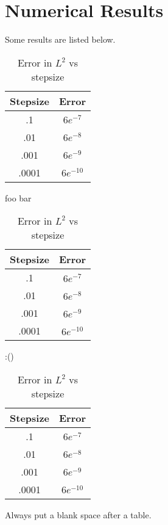 \documentclass[11pt]{article}
\numberwithin{equation}{section}
\theoremstyle{definition}
\begin{document}
\section{Numerical Results}
Some results are listed below.
\begin{table}[H]
  \caption{Error in $L^2$ vs stepsize}
  \label{some_table}
  \begin{center}
  \begin{tabular}{|c|c|}
  \hline
  Stepsize & Error \\ \hline
  .1 & $6e^{-7}$ \\ \hline
  .01 & $6e^{-8}$ \\ \hline
  .001 & $6e^{-9}$ \\ \hline
  .0001 & $6e^{-10}$ \\
  \hline
  \end{tabular}
  \end{center}
\end{table}
foo bar
\begin{table}[H]
  \caption{Error in $L^2$ vs stepsize}
  \label{some_table_2}
  \begin{center}
  \begin{tabular}{|c|c|}
  \hline
  Stepsize & Error \\ \hline
  .1 & $6e^{-7}$ \\ \hline
  .01 & $6e^{-8}$ \\ \hline
  .001 & $6e^{-9}$ \\ \hline
  .0001 & $6e^{-10}$ \\
  \hline
  \end{tabular}
  \end{center}
\end{table}
:()
\begin{table}[H]
  \caption{Error in $L^2$ vs stepsize}
  \label{some_table_3}
  \begin{center}
  \begin{tabular}{|c|c|}
  \hline
  Stepsize & Error \\ \hline
  .1 & $6e^{-7}$ \\ \hline
  .01 & $6e^{-8}$ \\ \hline
  .001 & $6e^{-9}$ \\ \hline
  .0001 & $6e^{-10}$ \\
  \hline
  \end{tabular}
  \end{center}
\end{table}
Always put a blank space after a table.



\end{document}
